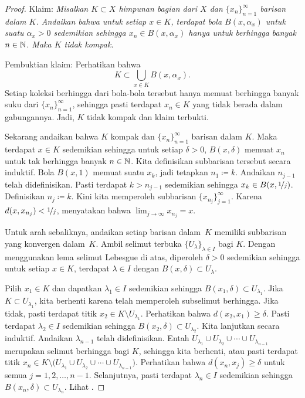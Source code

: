 \begin{proof}
Klaim: \emph{Misalkan $K \subset X$ himpunan bagian dari $X$ dan
$\{ x_n \}_{n=1}^\infty$ barisan dalam $K$.  Andaikan bahwa untuk setiap $x \in K$,
terdapat bola $B(x,\alpha_x)$ untuk suatu $\alpha_x > 0$ sedemikian sehingga
$x_n \in B(x,\alpha_x)$ hanya untuk berhingga banyak $n \in {\mathbb{N}}$.
Maka $K$ tidak kompak.}

Pembuktian klaim:
Perhatikan bahwa
\begin{equation*}
K \subset \bigcup_{x \in K} B(x,\alpha_x) .
\end{equation*}
Setiap koleksi berhingga dari bola-bola tersebut hanya memuat berhingga banyak
suku dari $\{ x_n \}_{n=1}^\infty$,
sehingga pasti terdapat $x_n \in K$
yang tidak berada dalam gabungannya.  Jadi, $K$ tidak kompak dan klaim
terbukti.

Sekarang andaikan bahwa $K$ kompak dan $\{ x_n \}_{n=1}^\infty$ barisan dalam $K$.
Maka terdapat $x \in K$ sedemikian sehingga
untuk setiap $\delta > 0$,
$B(x,\delta)$ memuat $x_n$ untuk tak berhingga banyak $n \in {\mathbb{N}}$.
Kita definisikan subbarisan tersebut secara induktif.
Bola $B(x,1)$ memuat suatu $x_k$, jadi tetapkan $n_1 \coloneqq k$.
Andaikan $n_{j-1}$ telah didefinisikan.
Pasti terdapat $k > n_{j-1}$
sedemikian sehingga $x_k \in B(x,\nicefrac{1}{j})$.  Definisikan
$n_j \coloneqq k$.
Kini kita memperoleh subbarisan $\{ x_{n_j} \}_{j=1}^\infty$.
Karena
$d(x,x_{n_j}) < \nicefrac{1}{j}$,   menyatakan bahwa
$\lim_{j\to\infty} x_{n_j} = x$.

Untuk arah sebaliknya, andaikan setiap barisan dalam~$K$
memiliki 
subbarisan yang konvergen dalam~$K$.
Ambil
selimut terbuka $\{ U_\lambda \}_{\lambda \in I}$ bagi $K$.
Dengan menggunakan lema selimut Lebesgue di atas, diperoleh $\delta > 0$
sedemikian sehingga untuk setiap $x \in K$, terdapat $\lambda \in I$ dengan
$B(x,\delta) \subset U_\lambda$.

Pilih $x_1 \in K$ dan dapatkan $\lambda_1 \in I$ sedemikian sehingga $B(x_1,\delta) \subset
U_{\lambda_1}$.
Jika $K \subset U_{\lambda_1}$, kita berhenti karena telah memperoleh
subselimut berhingga.
Jika tidak, pasti terdapat
titik $x_2 \in K \setminus U_{\lambda_1}$.
Perhatikan bahwa $d(x_2,x_1) \geq \delta$.
Pasti terdapat $\lambda_2 \in I$ sedemikian sehingga
$B(x_2,\delta) \subset U_{\lambda_2}$.
Kita lanjutkan secara induktif.  Andaikan $\lambda_{n-1}$ telah didefinisikan.
Entah
$U_{\lambda_1} \cup
U_{\lambda_2} \cup \cdots \cup
U_{\lambda_{n-1}}$ merupakan selimut berhingga bagi $K$, sehingga kita
berhenti, atau
pasti terdapat 
titik $x_n \in K \setminus \bigl( U_{\lambda_1} \cup
U_{\lambda_2} \cup \cdots \cup
U_{\lambda_{n-1}}\bigr)$.
Perhatikan bahwa $d(x_n,x_j) \geq \delta$ untuk semua $j = 1,2,\ldots,n-1$.
Selanjutnya, pasti terdapat $\lambda_n \in I$
sedemikian sehingga $B(x_n,\delta) \subset U_{\lambda_n}$.
Lihat .


\end{proof}
